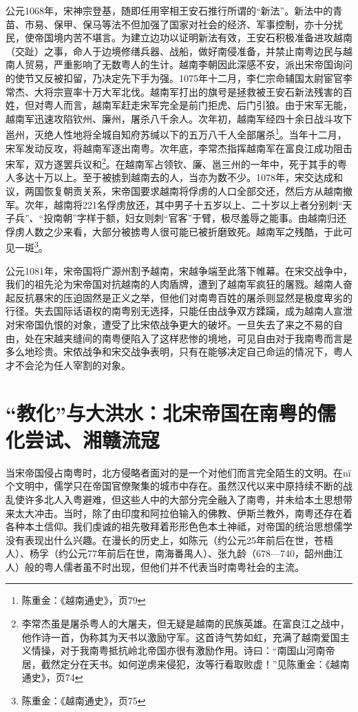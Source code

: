 公元1068年，宋神宗登基，随即任用宰相王安石推行所谓的“新法”。新法中的青苗、市易、保甲、保马等法不但加强了国家对社会的经济、军事控制，亦十分扰民，使帝国境内苦不堪言。为建立边功以证明新法有效，王安石积极准备进攻越南（交趾）之事，命人于边境修缮兵器、战船，做好南侵准备，并禁止南粤边民与越南人贸易，严重影响了无数粤人的生计。越南李朝因此深感不安，派出宋帝国询问的使节又反被扣留，乃决定先下手为强。1075年十二月，李仁宗命辅国太尉宦官李常杰、大将宗亶率十万大军北伐。越南军打出的旗号是拯救被王安石新法残害的百姓，但对粤人而言，越南军赶走宋军完全是前门拒虎、后门引狼。由于宋军无能，越南军迅速攻陷钦州、廉州，屠杀八千余人。次年初，越南军经四十余日战斗攻下邕州，灭绝人性地将全城自知府苏缄以下的五万八千人全部屠杀\footnote{陈重金：《越南通史》，页79}。当年十二月，宋军发动反攻，将越南军逐出南粤。次年底，李常杰指挥越南军在富良江成功阻击宋军，双方遂罢兵议和\footnote{李常杰虽是屠杀粤人的大屠夫，但无疑是越南的民族英雄。在富良江之战中，他作诗一首，伪称其为天书以激励守军。这首诗气势如虹，充满了越南爱国主义情操，对于我南粤抵抗岭北帝国亦很有激励作用。诗曰：“南国山河南帝居，截然定分在天书。如何逆虏来侵犯，汝等行看取败虚！”见陈重金：《越南通史》，页74}。在越南军占领钦、廉、邕三州的一年中，死于其手的粤人多达十万以上。至于被掳到越南去的人，当亦为数不少。1078年，宋交达成和议，两国恢复朝贡关系，宋帝国要求越南将俘虏的人口全部交还，然后方从越南撤军。次年，越南将221名俘虏放还，其中男子十五岁以上、二十岁以上者分别刺“天子兵”、“投南朝”字样于额，妇女则刺“官客”于臂，极尽羞辱之能事。由越南归还俘虏人数之少来看，大部分被掳粤人很可能已被折磨致死。越南军之残酷，于此可见一斑\footnote{陈重金：《越南通史》，页75}。

公元1081年，宋帝国将广源州割予越南，宋越争端至此落下帷幕。在宋交战争中，我们的祖先沦为宋帝国对抗越南的人肉盾牌，遭到了越南军疯狂的屠戮。越南人奋起反抗暴宋的压迫固然是正义之举，但他们对南粤百姓的屠杀则显然是极度卑劣的行径。失去国际话语权的南粤别无选择，只能任由战争双方蹂躏，成为越南人宣泄对宋帝国仇恨的对象，遭受了比宋侬战争更大的破坏。一旦失去了来之不易的自由，处在宋越夹缝间的南粤便陷入了这样悲惨的境地，可见自由对于我南粤而言是多么地珍贵。宋侬战争和宋交战争表明，只有在能够决定自己命运的情况下，粤人才不会沦为任人宰割的对象。

\section{“教化”与大洪水：北宋帝国在南粤的儒化尝试、湘赣流寇}

当宋帝国侵占南粤时，北方侵略者面对的是一个对他们而言完全陌生的文明。在nï 个文明中，儒学只在帝国官僚聚集的城市中存在。虽然汉代以来中原持续不断的战乱使许多北人入粤避难，但这些人中的大部分完全融入了南粤，并未给本土思想带来太大冲击。当时，除了由印度和阿拉伯输入的佛教、伊斯兰教外，南粤还存在着各种本土信仰。我们虔诚的祖先敬拜着形形色色本土神祗，对帝国的统治思想儒学没有表现出什么兴趣。在漫长的历史上，如陈元（约公元25年前后在世，苍梧人）、杨孚（约公元77年前后在世，南海番禺人）、张九龄（678—740，韶州曲江人）般的粤人儒者虽不时出现，但他们并不代表当时南粤社会的主流。

